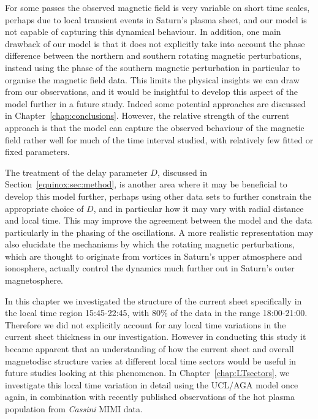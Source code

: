 For some passes the observed magnetic field is very variable on short time scales, perhaps due to local transient events in Saturn's plasma sheet, and our model is not capable of capturing this dynamical behaviour. In addition, one main drawback of our model is that it does not explicitly take into account the phase difference between the northern and southern rotating magnetic perturbations, instead using the phase of the southern magnetic perturbation in particular to organise the magnetic field data. This limits the physical insights we can draw from our observations, and it would be insightful to develop this aspect of the model further in a future study. Indeed some potential approaches are discussed in Chapter~\ref{chap:conclusions}. However, the relative strength of the current approach is that the model can capture the observed behaviour of the magnetic field rather well for much of the time interval studied, with relatively few fitted or fixed parameters.

The treatment of the delay parameter $D$, discussed in Section~\ref{equinox:sec:method}, is another area where it may be beneficial to develop this model further, perhaps using other data sets to further constrain the appropriate choice of $D$, and in particular how it may vary with radial distance and local time. This may improve the agreement between the model and the data particularly in the phasing of the oscillations. A more realistic representation may also elucidate the mechanisms by which the rotating magnetic perturbations, which are thought to originate from vortices in Saturn's upper atmosphere and ionosphere, actually control the dynamics much further out in Saturn's outer magnetosphere.

In this chapter we investigated the structure of the current sheet specifically in the local time region 15:45-22:45, with 80\% of the data in the range 18:00-21:00. Therefore we did not explicitly account for any local time variations in the current sheet thickness in our investigation. However in conducting this study it became apparent that an understanding of how the current sheet and overall magnetodisc structure varies at different local time sectors would be useful in future studies looking at this phenomenon. In Chapter~\ref{chap:LTsectors}, we investigate this local time variation in detail using the UCL/AGA model once again, in combination with recently published observations of the hot plasma population from \textit{Cassini} MIMI data.
